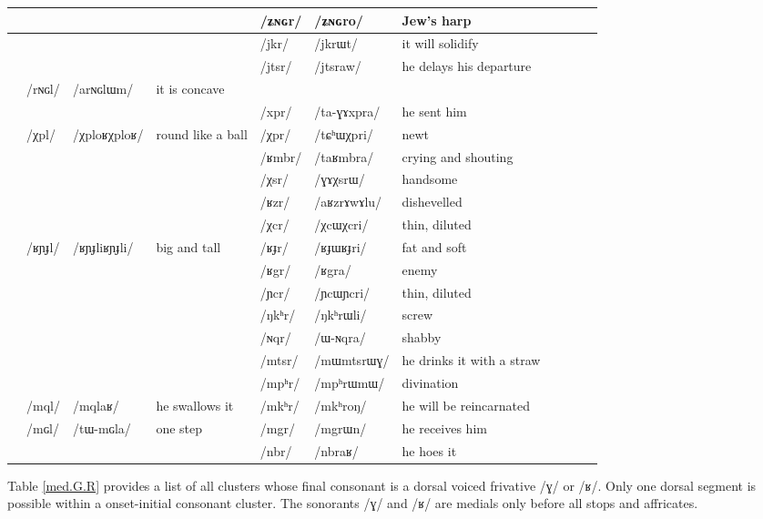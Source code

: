 \documentclass[oldfontcommands,oneside,a4paper,11pt]{article}
\newcommand{\ipa}[1]{{\phon/#1/}} %
\newcommand{\trois}[1]{/#1/}
\newcommand{\tib}[1]{\cellcolor{lightgray}\textbf{#1}}
\newcommand{\idph}[1]{\cellcolor{gray}\textbf{#1}}
\begin{document}
\begin{table}
{\begin{tabular}{l|lll|lll|lll|l}
	&	&	&	& \trois{ʑɴɢr}  	& \ipa{ʑɴɢro}  	&Jew's harp 	\\	
\midrule							
	&	&	&	&\trois{jkr}  	& \ipa{jkrɯt}  	& it will solidify \\	
	&	&	&	&\trois{jtsr}  	& \ipa{jtsraw}  	&he delays his departure \\	
\midrule			
	& \trois{rɴɢl}  	& \ipa{arɴɢlɯm}  	&it is concave 	&	&	&\\	
	&	&	&	& \trois{xpr}  	& \ipa{ta-ɣɤxpra}  	&he sent him \\	
\midrule							
	&\trois{χpl} \idph{}	&\ipa{χploʁχploʁ}  	&round like a ball	&\trois{χpr}  	& \ipa{tɕʰɯχpri}  	& newt\\	
	&	&	&	&\trois{ʁmbr}  	& \ipa{taʁmbra}  	& crying and shouting\\	
	&	&	&	&\trois{χsr}  	& \ipa{ɣɤχsrɯ}  	& handsome \\	
	&	&	&	&\trois{ʁzr}  	& \ipa{aʁzrɤwɤlu}  	& dishevelled\\	
	&	&	&	&\trois{χcr} \idph{} 	& \ipa{χcɯχcri}  	& thin, diluted \\	
	&\trois{ʁɲɟl}  \idph{}	& \ipa{ʁɲɟliʁɲɟli}  	& big and tall	&\trois{ʁɟr}  \idph{}	& \ipa{ʁɟɯʁɟri}  	& fat and soft\\	
	&	&	&	&\trois{ʁgr} \tib{}  	& \ipa{ʁgra}  	& enemy\\	
\midrule							
	&	&	&	&\trois{ɲcr} \idph{} 	& \ipa{ɲcɯɲcri}  	&thin, diluted \\	
	&	&	&	&\trois{ŋkʰr}  	& \ipa{ŋkʰrɯli}  	&screw \\	
	&	&	&	&\trois{ɴqr}  	& \ipa{ɯ-ɴqra}  	& shabby\\	
\midrule							
	&	&	&	&\trois{mtsr}  	& \ipa{mɯmtsrɯɣ}  	&he drinks it with a straw \\	
	&	&	&	&\trois{mpʰr}  	& \ipa{mpʰrɯmɯ}  	& divination\\	
	&\trois{mql}  	& \ipa{mqlaʁ}  	& he swallows it	&\trois{mkʰr}  	& \ipa{mkʰroŋ}  	&he will be reincarnated \\	
	&\trois{mɢl}  	& \ipa{tɯ-mɢla}  	& one step	&\trois{mgr}  	& \ipa{mgrɯn}  	& he receives him\\	
\midrule							
	&	&	&	&\trois{nbr}  	& \ipa{nbraʁ}  	&he hoes it \\	
\end{tabular}}
\end{table}	
						
		Table  \ref{med.G.R} provides a  list of all clusters whose final consonant is a dorsal voiced frivative  \ipa{ɣ} or \ipa{ʁ}.  Only one dorsal segment is possible within a onset-initial consonant cluster. The sonorants \ipa{ɣ} and \ipa{ʁ} are medials only before all stops and affricates.
						
\end{document}
